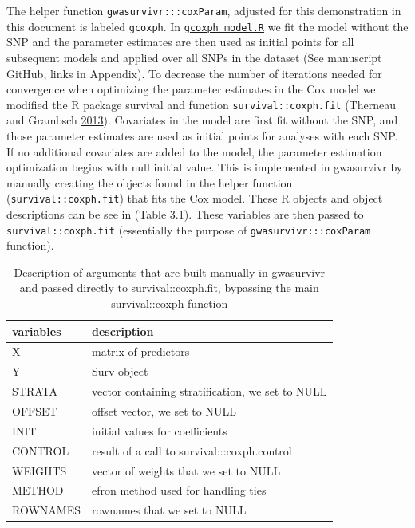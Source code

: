 \documentclass[]{DissertateOSU}
\begin{document}
The helper function \texttt{gwasurvivr:::coxParam}, adjusted for this
demonstration in this document is labeled \texttt{gcoxph}. In
\href{https://github.com/suchestoncampbelllab/gwasurvivr_manuscript/blob/master/supplemental_data/code/gcoxph_model.R}{\texttt{gcoxph\_model.R}}
we fit the model without the SNP and the parameter estimates are then
used as initial points for all subsequent models and applied over all
SNPs in the dataset (See manuscript GitHub, links in Appendix). To
decrease the number of iterations needed for convergence when optimizing
the parameter estimates in the Cox model we modified the R package
survival and function \texttt{survival::coxph.fit} (Therneau and
Grambsch \protect\hyperlink{ref-therneau2013}{2013}). Covariates in the
model are first fit without the SNP, and those parameter estimates are
used as initial points for analyses with each SNP. If no additional
covariates are added to the model, the parameter estimation optimization
begins with null initial value. This is implemented in gwasurvivr by
manually creating the objects found in the helper function
(\texttt{survival::coxph.fit}) that fits the Cox model. These R objects
and object descriptions can be see in (Table 3.1). These variables are
then passed to \texttt{survival::coxph.fit} (essentially the purpose of
\texttt{gwasurvivr:::coxParam} function).

\begin{table}[t]

\caption{\label{tab:unnamed-chunk-27}Description of arguments that are built manually in gwasurvivr and passed directly to survival::coxph.fit, bypassing the main survival::coxph function}
\centering
\fontsize{9}{11}\selectfont
\begin{tabular}{ll}
\toprule
variables & description\\
\midrule
X & matrix of predictors\\
Y & Surv object\\
STRATA & vector containing stratification, we set to NULL\\
OFFSET & offset vector, we set to NULL\\
INIT & initial values for coefficients\\
\addlinespace
CONTROL & result of a call to survival:::coxph.control\\
WEIGHTS & vector of weights that we set to NULL\\
METHOD & efron method used for handling ties\\
ROWNAMES & rownames that we set to NULL\\
\bottomrule
\end{tabular}
\end{table}
\end{document}

